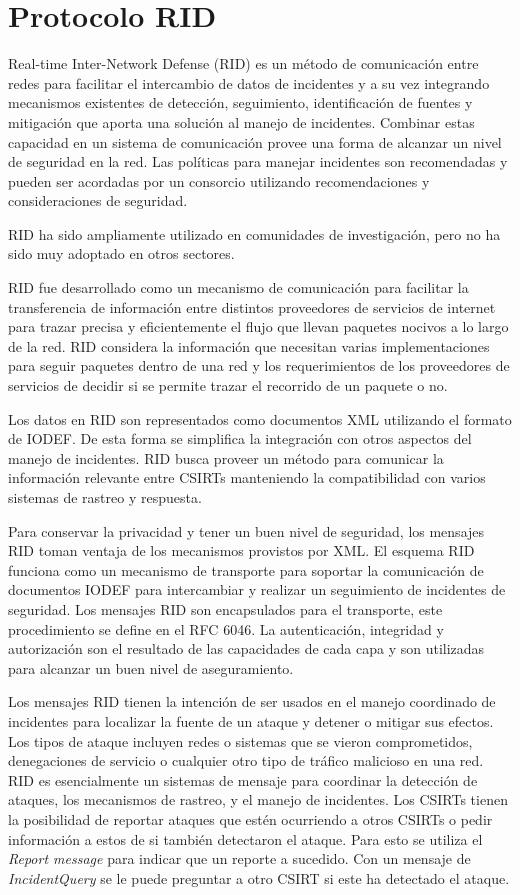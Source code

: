\section{Protocolo RID}

Real-time Inter-Network Defense (RID) es un método de comunicación entre redes 
para facilitar el intercambio de datos de incidentes y a su vez integrando 
mecanismos existentes de detección, seguimiento, identificación de fuentes y 
mitigación que aporta una solución al manejo de incidentes. Combinar estas 
capacidad en un sistema de comunicación provee una forma de alcanzar un nivel de 
seguridad en la red. Las políticas para manejar incidentes son recomendadas y 
pueden ser acordadas por un consorcio utilizando recomendaciones y 
consideraciones de seguridad.

RID ha sido ampliamente utilizado en comunidades de investigación, pero no ha 
sido muy adoptado en otros sectores.

RID fue desarrollado como un mecanismo de comunicación para facilitar la 
transferencia de información entre distintos proveedores de servicios de 
internet para trazar precisa y eficientemente el flujo que llevan paquetes 
nocivos a lo largo de la red. RID considera la información que necesitan 
varias implementaciones para seguir paquetes dentro de una red y los 
requerimientos de los proveedores de servicios de decidir si se permite trazar el 
recorrido de un paquete o no.

Los datos en RID son representados como documentos XML utilizando el formato de 
IODEF. De esta forma se simplifica la integración con otros aspectos del manejo 
de incidentes. RID busca proveer un método para comunicar la información 
relevante entre CSIRTs manteniendo la compatibilidad con varios sistemas de 
rastreo y respuesta.

Para conservar la privacidad y tener un buen nivel de seguridad, los mensajes 
RID toman ventaja de los mecanismos provistos por XML. El esquema RID funciona 
como un mecanismo de transporte para soportar la comunicación de documentos 
IODEF para intercambiar y realizar un seguimiento de incidentes de seguridad. 
Los mensajes RID son encapsulados para el transporte, este procedimiento se 
define en el RFC 6046. La autenticación, integridad y autorización son el 
resultado de las capacidades de cada capa y son utilizadas para alcanzar un 
buen nivel de aseguramiento.

Los mensajes RID tienen la intención de ser usados en el manejo coordinado de 
incidentes para localizar la fuente de un ataque y detener o mitigar sus 
efectos. Los tipos de ataque incluyen redes o sistemas que se vieron 
comprometidos, denegaciones de servicio o cualquier otro tipo de tráfico 
malicioso en una red. RID es esencialmente un sistemas de mensaje para coordinar 
la detección de ataques, los mecanismos de rastreo, y el manejo de incidentes. 
Los CSIRTs tienen la posibilidad de reportar ataques que estén ocurriendo a 
otros CSIRTs o pedir información a estos de si también detectaron el ataque. 
Para esto se utiliza el \emph{Report message} para indicar que un reporte a 
sucedido. Con un mensaje de \emph{IncidentQuery} se le puede preguntar a otro 
CSIRT si este ha detectado el ataque.

